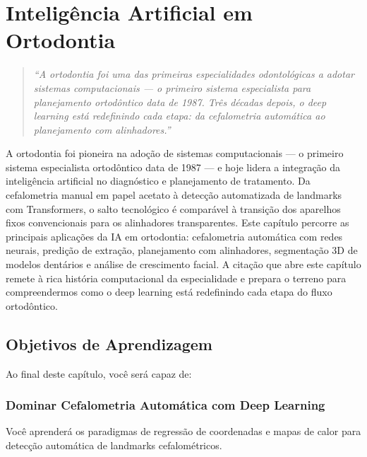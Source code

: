 \chapter{Inteligência Artificial em Ortodontia}
\label{cap:ortodontia-ia}
\niveltres

\begin{quote}
\textit{``A ortodontia foi uma das primeiras especialidades odontológicas a adotar sistemas computacionais --- o primeiro sistema especialista para planejamento ortodôntico data de 1987. Três décadas depois, o deep learning está redefinindo cada etapa: da cefalometria automática ao planejamento com alinhadores.''}
\end{quote}

A ortodontia foi pioneira na adoção de sistemas computacionais --- o primeiro sistema especialista ortodôntico data de 1987 --- e hoje lidera a integração da inteligência artificial no diagnóstico e planejamento de tratamento. Da cefalometria manual em papel acetato à detecção automatizada de landmarks com Transformers, o salto tecnológico é comparável à transição dos aparelhos fixos convencionais para os alinhadores transparentes. Este capítulo percorre as principais aplicações da IA em ortodontia: cefalometria automática com redes neurais, predição de extração, planejamento com alinhadores, segmentação 3D de modelos dentários e análise de crescimento facial. A citação que abre este capítulo remete à rica história computacional da especialidade e prepara o terreno para compreendermos como o deep learning está redefinindo cada etapa do fluxo ortodôntico.

\section{Objetivos de Aprendizagem}

Ao final deste capítulo, você será capaz de:

\subsection{Dominar Cefalometria Automática com Deep Learning}
Você aprenderá os paradigmas de regressão de coordenadas e mapas de calor para detecção automática de landmarks cefalométricos.


